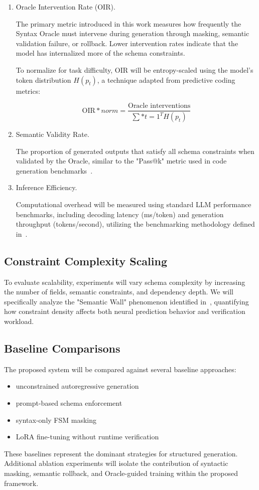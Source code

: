 \begin{enumerate}
\item Oracle Intervention Rate (OIR).

The primary metric introduced in this work measures how frequently the
Syntax Oracle must intervene during generation through masking, semantic
validation failure, or rollback. Lower intervention rates indicate that the
model has internalized more of the schema constraints.

To normalize for task difficulty, OIR will be entropy-scaled using the model's 
token distribution $H(p_t)$, a technique adapted from predictive coding 
metrics:

\begin{equation}
\text{OIR}*{norm} =
\frac{\text{Oracle interventions}}
{\sum*{t=1}^{T} H(p_t)}
\end{equation}

\item Semantic Validity Rate.

The proportion of generated outputs that satisfy all schema constraints when
validated by the Oracle, similar to the "Pass@k" metric used in code generation 
benchmarks~\cite{chen2021evaluating}.

\item Inference Efficiency.

Computational overhead will be measured using standard LLM performance
benchmarks, including decoding latency (ms/token) and generation throughput 
(tokens/second), utilizing the benchmarking methodology defined 
in~\cite{miao2024specinfer}.

\end{enumerate}

\subsection{Constraint Complexity Scaling}
To evaluate scalability, experiments will vary schema complexity by
increasing the number of fields, semantic constraints, and dependency depth.
We will specifically analyze the "Semantic Wall" phenomenon 
identified in~\cite{valmeekam2023planning}, quantifying how 
constraint density affects both neural prediction behavior and 
verification workload.

\subsection{Baseline Comparisons}
The proposed system will be compared against several baseline approaches:

\begin{itemize}
\item unconstrained autoregressive generation
\item prompt-based schema enforcement
\item syntax-only FSM masking
\item LoRA fine-tuning without runtime verification
\end{itemize}

These baselines represent the dominant strategies for structured generation.
Additional ablation experiments will isolate the contribution of syntactic
masking, semantic rollback, and Oracle-guided training within the proposed
framework.